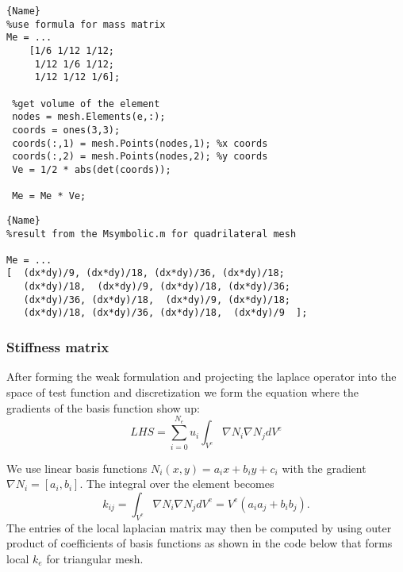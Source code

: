 \documentclass[unicode,11pt,a4paper,oneside,numbers=endperiod,openany]{scrartcl}
\begin{document}
\noindent\begin{minipage}{.45\textwidth}
\begin{lstlisting}[caption=Triangular $m_e$,frame=tlrb]{Name}
%use formula for mass matrix
Me = ...
    [1/6 1/12 1/12;
     1/12 1/6 1/12;
     1/12 1/12 1/6];
 
 %get volume of the element
 nodes = mesh.Elements(e,:);
 coords = ones(3,3);
 coords(:,1) = mesh.Points(nodes,1); %x coords
 coords(:,2) = mesh.Points(nodes,2); %y coords
 Ve = 1/2 * abs(det(coords));
 
 Me = Me * Ve;
\end{lstlisting}
\end{minipage}\hfill
\begin{minipage}{.45\textwidth}
\begin{lstlisting}[caption=Quadrilateral $m_e$,frame=tlrb]{Name}
%result from the Msymbolic.m for quadrilateral mesh

Me = ... 
[  (dx*dy)/9, (dx*dy)/18, (dx*dy)/36, (dx*dy)/18;
   (dx*dy)/18,  (dx*dy)/9, (dx*dy)/18, (dx*dy)/36;
   (dx*dy)/36, (dx*dy)/18,  (dx*dy)/9, (dx*dy)/18;
   (dx*dy)/18, (dx*dy)/36, (dx*dy)/18,  (dx*dy)/9  ];
\end{lstlisting}
\end{minipage}

\subsubsection{Stiffness matrix}
After forming the weak formulation and projecting the laplace operator into the space of test function and discretization we form the equation where the gradients of the basis function show up:
\begin{equation}
    LHS = \sum_{i=0}^{N_e} u_i \int_{V^e} \nabla N_i \nabla N_j dV^e
\end{equation}

We use linear basis functions $N_i(x,y) = a_ix + b_iy + c_i$ with the gradient $\nabla N_i = [a_i, b_i]$. The integral over the element becomes
\begin{equation}
    k_{ij} = \int_{V^e} \nabla N_i \nabla N_j dV^e = V^e (a_ia_j + b_ib_j).
\end{equation}
The entries of the local laplacian matrix may then be computed by using outer product of coefficients of basis functions as shown in the code below that forms local $k_e$ for triangular mesh.
\end{document}
